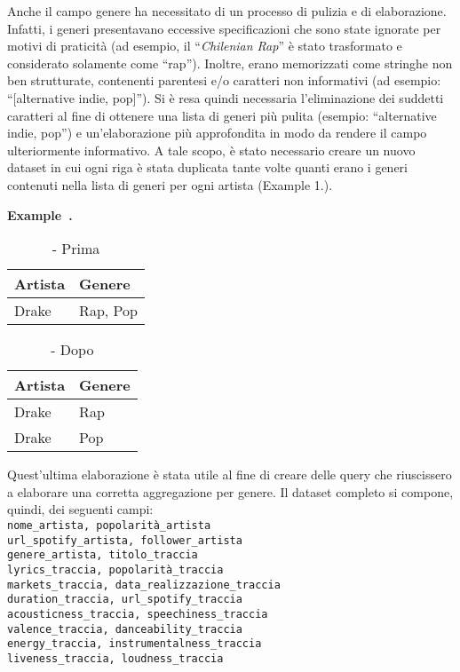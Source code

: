\documentclass[fleqn,10pt]{SelfArx} %
\newcounter{example}[section]
\newenvironment{example}[1][]{\refstepcounter{example}\par\medskip
   \textbf{Example~\theexample. #1} \rmfamily}{\medskip}
\begin{document}
Anche il campo genere ha necessitato di un processo di pulizia e di elaborazione. Infatti, i generi presentavano eccessive specificazioni che sono state ignorate per motivi di praticità (ad esempio, il “\textit{Chilenian Rap}” è stato trasformato e considerato solamente come “rap”). Inoltre, erano memorizzati come stringhe non ben strutturate, contenenti parentesi e/o caratteri non informativi (ad esempio: “[alternative indie, pop]”). Si è resa quindi necessaria l’eliminazione dei suddetti caratteri al fine di ottenere una lista di generi più pulita (esempio: “alternative indie, pop”) e un’elaborazione più approfondita in modo da rendere il campo ulteriormente informativo. 
A tale scopo, è stato necessario creare un nuovo dataset in cui ogni riga è stata duplicata tante volte quanti erano i generi contenuti nella lista di generi per ogni artista (Example 1.).

\begin{example}

\begin{table}[htp]
\centering
\caption{- Prima}\label{tabella}
\begin{tabular}{ |p{1.5cm}|p{2cm}| }
 \hline
  Artista & Genere\\
\hline
  Drake & Rap, Pop\\
\hline
\end{tabular}
\end{table}
 
\begin{table}[htp]
\caption{- Dopo}\label{tabella}
\centering
\begin{tabular}{ |p{1.5cm}|p{2cm}| }
\hline
  Artista & Genere \\
\hline
  Drake & Rap \\
\hline
  Drake & Pop\\
\hline
\end{tabular}
\end{table}

\end{example}

Quest’ultima elaborazione è stata utile al fine di creare delle query che riuscissero a elaborare una corretta aggregazione per genere.
Il dataset completo si compone, quindi, dei seguenti campi:
\\ \texttt{nome\_artista, popolarità\_artista \\ url\_spotify\_artista, follower\_artista \\ genere\_artista, titolo\_traccia \\ lyrics\_traccia, popolarità\_traccia\\ markets\_traccia, data\_realizzazione\_traccia \\ duration\_traccia, url\_spotify\_traccia \\ acousticness\_traccia, speechiness\_traccia \\ valence\_traccia, danceability\_traccia \\ energy\_traccia, instrumentalness\_traccia \\ liveness\_traccia, loudness\_traccia}
\end{document}
